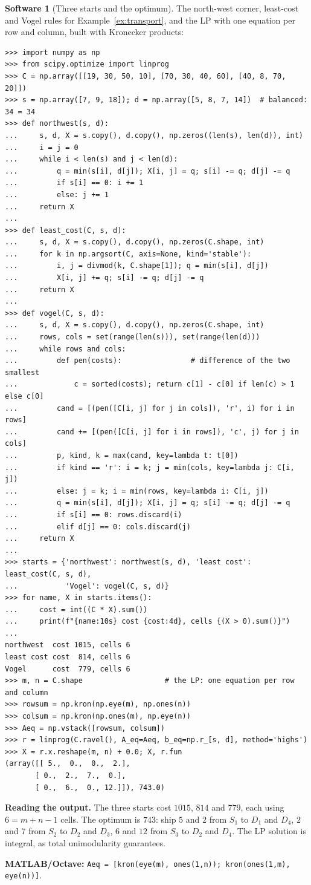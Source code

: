 \documentclass[11pt,a4paper]{article}
\numberwithin{equation}{section}
\theoremstyle{definition}
\newtheorem{software}[thm]{Software}
\begin{document}
\begin{software}[Three starts and the optimum]
\label{sw:transport}
The north-west corner, least-cost and Vogel rules for Example~\ref{ex:transport}, and the LP with one equation per row and column, built with Kronecker products:
{\small\begin{verbatim}
>>> import numpy as np
>>> from scipy.optimize import linprog
>>> C = np.array([[19, 30, 50, 10], [70, 30, 40, 60], [40, 8, 70, 20]])
>>> s = np.array([7, 9, 18]); d = np.array([5, 8, 7, 14])  # balanced: 34 = 34
>>> def northwest(s, d):
...     s, d, X = s.copy(), d.copy(), np.zeros((len(s), len(d)), int)
...     i = j = 0
...     while i < len(s) and j < len(d):
...         q = min(s[i], d[j]); X[i, j] = q; s[i] -= q; d[j] -= q
...         if s[i] == 0: i += 1
...         else: j += 1
...     return X
...
>>> def least_cost(C, s, d):
...     s, d, X = s.copy(), d.copy(), np.zeros(C.shape, int)
...     for k in np.argsort(C, axis=None, kind='stable'):
...         i, j = divmod(k, C.shape[1]); q = min(s[i], d[j])
...         X[i, j] += q; s[i] -= q; d[j] -= q
...     return X
...
>>> def vogel(C, s, d):
...     s, d, X = s.copy(), d.copy(), np.zeros(C.shape, int)
...     rows, cols = set(range(len(s))), set(range(len(d)))
...     while rows and cols:
...         def pen(costs):                # difference of the two smallest
...             c = sorted(costs); return c[1] - c[0] if len(c) > 1 else c[0]
...         cand = [(pen([C[i, j] for j in cols]), 'r', i) for i in rows]
...         cand += [(pen([C[i, j] for i in rows]), 'c', j) for j in cols]
...         p, kind, k = max(cand, key=lambda t: t[0])
...         if kind == 'r': i = k; j = min(cols, key=lambda j: C[i, j])
...         else: j = k; i = min(rows, key=lambda i: C[i, j])
...         q = min(s[i], d[j]); X[i, j] = q; s[i] -= q; d[j] -= q
...         if s[i] == 0: rows.discard(i)
...         elif d[j] == 0: cols.discard(j)
...     return X
...
>>> starts = {'northwest': northwest(s, d), 'least cost': least_cost(C, s, d),
...           'Vogel': vogel(C, s, d)}
>>> for name, X in starts.items():
...     cost = int((C * X).sum())
...     print(f"{name:10s} cost {cost:4d}, cells {(X > 0).sum()}")
...
northwest  cost 1015, cells 6
least cost cost  814, cells 6
Vogel      cost  779, cells 6
>>> m, n = C.shape                   # the LP: one equation per row and column
>>> rowsum = np.kron(np.eye(m), np.ones(n))
>>> colsum = np.kron(np.ones(m), np.eye(n))
>>> Aeq = np.vstack([rowsum, colsum])
>>> r = linprog(C.ravel(), A_eq=Aeq, b_eq=np.r_[s, d], method='highs')
>>> X = r.x.reshape(m, n) + 0.0; X, r.fun
(array([[ 5.,  0.,  0.,  2.],
       [ 0.,  2.,  7.,  0.],
       [ 0.,  6.,  0., 12.]]), 743.0)
\end{verbatim}}
\textbf{Reading the output.} The three starts cost $1015$, $814$ and $779$, each using $6 = m + n - 1$ cells. The optimum is $743$: ship $5$ and $2$ from $S_1$ to $D_1$ and $D_4$, $2$ and $7$ from $S_2$ to $D_2$ and $D_3$, $6$ and $12$ from $S_3$ to $D_2$ and $D_4$. The LP solution is integral, as total
unimodularity guarantees.

\textbf{MATLAB/Octave:} \texttt{Aeq = [kron(eye(m), ones(1,n)); kron(ones(1,m), eye(n))]}.
\end{software}
\end{document}
